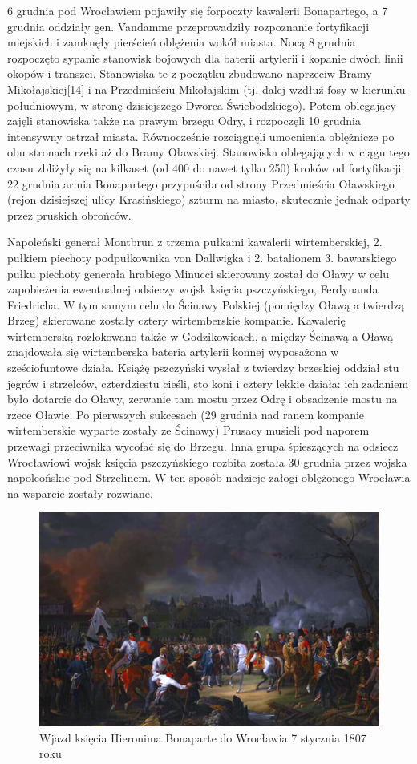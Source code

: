 \documentclass{article}
\begin{document}
6 grudnia pod Wrocławiem pojawiły się forpoczty kawalerii Bonapartego, a 7 grudnia oddziały gen. Vandamme przeprowadziły rozpoznanie fortyfikacji miejskich i zamknęły pierścień oblężenia wokół miasta. Nocą 8 grudnia rozpoczęto sypanie stanowisk bojowych dla baterii artylerii i kopanie dwóch linii okopów i transzei. Stanowiska te z początku zbudowano naprzeciw Bramy Mikołajskiej[14] i na Przedmieściu Mikołajskim (tj. dalej wzdłuż fosy w kierunku południowym, w stronę dzisiejszego Dworca Świebodzkiego). Potem oblegający zajęli stanowiska także na prawym brzegu Odry, i rozpoczęli 10 grudnia intensywny ostrzał miasta. Równocześnie rozciągnęli umocnienia oblężnicze po obu stronach rzeki aż do Bramy Oławskiej. Stanowiska oblegających w ciągu tego czasu zbliżyły się na kilkaset (od 400 do nawet tylko 250) kroków od fortyfikacji; 22 grudnia armia Bonapartego przypuściła od strony Przedmieścia Oławskiego (rejon dzisiejszej ulicy Krasińskiego) szturm na miasto, skutecznie jednak odparty przez pruskich obrońców.

Napoleński generał Montbrun z trzema pułkami kawalerii wirtemberskiej, 2. pułkiem piechoty podpułkownika von Dallwigka i 2. batalionem 3. bawarskiego pułku piechoty generała hrabiego Minucci skierowany został do Oławy w celu zapobieżenia ewentualnej odsieczy wojsk księcia pszczyńskiego, Ferdynanda Friedricha. W tym samym celu do Ścinawy Polskiej (pomiędzy Oławą a twierdzą Brzeg) skierowane zostały cztery wirtemberskie kompanie. Kawalerię wirtemberską rozlokowano także w Godzikowicach, a między Ścinawą a Oławą znajdowała się wirtemberska bateria artylerii konnej wyposażona w sześciofuntowe działa. Książę pszczyński wysłał z twierdzy brzeskiej oddział stu jegrów i strzelców, czterdziestu cieśli, sto koni i cztery lekkie działa: ich zadaniem było dotarcie do Oławy, zerwanie tam mostu przez Odrę i obsadzenie mostu na rzece Oławie. Po pierwszych sukcesach (29 grudnia nad ranem kompanie wirtemberskie wyparte zostały ze Ścinawy) Prusacy musieli pod naporem przewagi przeciwnika wycofać się do Brzegu. Inna grupa śpieszących na odsiecz Wrocławiowi wojsk księcia pszczyńskiego rozbita została 30 grudnia przez wojska napoleońskie pod Strzelinem. W ten sposób nadzieje załogi oblężonego Wrocławia na wsparcie zostały rozwiane.
 \begin{figure}[h!]
\centering
\includegraphics[scale=1]{7.png}
\caption{Wjazd księcia Hieronima Bonaparte do Wrocławia 7 stycznia 1807 roku}
\end{figure}
\end{document}
